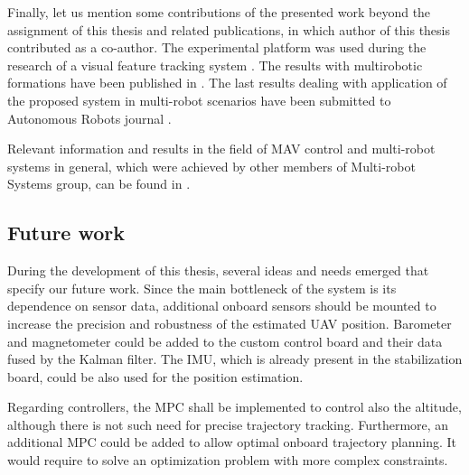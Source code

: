 Finally, let us mention some contributions of the presented work beyond the assignment of this thesis and related publications, in which author of this thesis contributed as a co-author. The experimental platform was used during the research of a visual feature tracking system \citep{chudoba2014surf}. The results with multirobotic formations have been published in \citep{saska_baca2014}. The last results dealing with application of the proposed system in multi-robot scenarios have been submitted to Autonomous Robots journal \citep{saska2015submitted}. 

Relevant information and results in the field of MAV control and multi-robot systems in general, which were achieved by other members of Multi-robot Systems group, can be found in \cite{Saska14:212936,Saska14:221382,Saska14:221385,Saska14:219889,Saska13:206002,Saska12:199007}.

\subsection{Future work}

During the development of this thesis, several ideas and needs emerged that specify our future work. Since the main bottleneck of the system is its dependence on sensor data, additional onboard sensors should be mounted to increase the precision and robustness of the estimated UAV position. Barometer and magnetometer could be added to the custom control board and their data fused by the Kalman filter. The IMU, which is already present in the stabilization board, could be also used for the position estimation.

Regarding controllers, the MPC shall be implemented to control also the altitude, although there is not such need for precise trajectory tracking. Furthermore, an additional MPC could be added to allow optimal onboard trajectory planning. It would require to solve an optimization problem with more complex constraints. 

